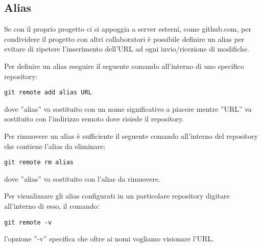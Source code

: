 \subsection{Alias}
Se con il proprio progetto ci si appoggia a server esterni, come github.com, per condividere il progetto con altri collaboratori è possibile definire un alias per evitare di ripetere l'inserimento dell'URL ad ogni invio/ricezione di modifiche.

Per definire un alias eseguire il seguente comando all'interno di uno specifico repository:

\begin{center}
\texttt{git remote add alias URL}
\end{center}

dove ''alias'' va sostituito con un nome significativo a piacere mentre ''URL'' va sostituito con l'indirizzo remoto dove risiede il repository.

Per rimuovere un alias è sufficiente il seguente comando all'interno del repository che contiene l'alias da eliminare:

\begin{center}
\texttt{git remote rm alias}
\end{center}

dove ''alias'' va sostituito con l'alias da rimuovere.

Per visualizzare gli alias configurati in un particolare repository digitare all'interno di esso, il comando:

\begin{center}
\texttt{git remote -v}
\end{center}

l'opzione ''-v'' specifica che oltre ai nomi vogliamo visionare l'URL.